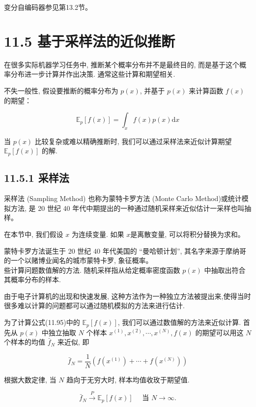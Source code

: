 \documentclass[10pt]{article}
\begin{document}
变分自编码器参见第13.2节。

\section*{11.5 基于采样法的近似推断}
在很多实际机器学习任务中, 推断某个概率分布并不是最终目的, 而是基于这个概率分布进一步计算并作出决策. 通常这些计算和期望相关.

不失一般性, 假设要推断的概率分布为 $p(x)$, 并基于 $p(x)$ 来计算函数 $f(x)$的期望：


\begin{equation*}
\mathbb{E}_{p}[f(x)]=\int_{x} f(x) p(x) \mathrm{d} x \tag{11.95}
\end{equation*}


当 $p(x)$ 比较复杂或难以精确推断时, 我们可以通过采样法来近似计算期望 $\mathbb{E}_{p}[f(x)]$ 的解.

\subsection*{11.5.1 采样法}
采样法 (Sampling Method) 也称为蒙特卡罗方法 (Monte Carlo Method)或统计模拟方法, 是 20 世纪 40 年代中期提出的一种通过随机采样来近似估计一采样也叫抽样。

在本节中, 我们假设 $x$ 为连续变量. 如果 $x$是离散变量, 可以将积分替换为求和。

蒙特卡罗方法诞生于 20 世纪 40 年代美国的 “曼哈顿计划”, 其名字来源于摩纳哥的一个以赌博业闻名的城市蒙特卡罗, 象征概率。\\
些计算问题数值解的方法. 随机采样指从给定概率密度函数 $p(x)$ 中抽取出符合其概率分布的样本.

由于电子计算机的出现和快速发展, 这种方法作为一种独立方法被提出来,使得当时很多难以计算的问题都可以通过随机模拟的方法来进行估计.

为了计算公式(11.95)中的 $\mathbb{E}_{p}[f(x)]$, 我们可以通过数值解的方法来近似计算. 首先从 $p(x)$ 中独立抽取 $N$ 个样本 $x^{(1)}, x^{(2)}, \cdots, x^{(N)}, f(x)$ 的期望可以用这 $N$个样本的均值 $\bar{f}_{N}$ 来近似, 即


\begin{equation*}
\bar{f}_{N}=\frac{1}{N}\left(f\left(x^{(1)}\right)+\cdots+f\left(x^{(N)}\right)\right) \tag{11.96}
\end{equation*}


根据大数定律, 当 $N$ 趋向于无穷大时, 样本均值收玫于期望值.


\begin{equation*}
\bar{f}_{N} \xrightarrow{P} \mathbb{E}_{p}[f(x)] \quad \text { 当 } N \rightarrow \infty . \tag{11.97}
\end{equation*}
\end{document}
